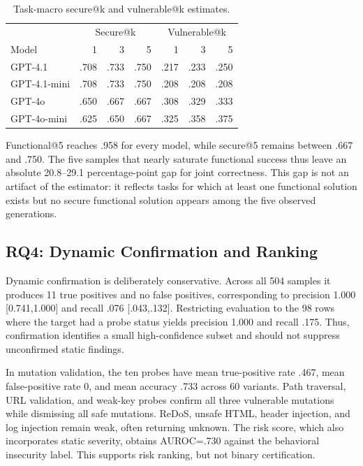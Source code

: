 \documentclass[sigconf,nonacm]{acmart}
\begin{document}
\begin{table}[t]
\caption{Task-macro secure@k and vulnerable@k estimates.}
\label{tab:at-k}
\centering
\small
\begin{tabular}{lrrrrrr}
\toprule
& \multicolumn{3}{c}{Secure@k} & \multicolumn{3}{c}{Vulnerable@k} \\
Model & 1 & 3 & 5 & 1 & 3 & 5 \\
\midrule
GPT-4.1 & .708 & .733 & .750 & .217 & .233 & .250 \\
GPT-4.1-mini & .708 & .733 & .750 & .208 & .208 & .208 \\
GPT-4o & .650 & .667 & .667 & .308 & .329 & .333 \\
GPT-4o-mini & .625 & .650 & .667 & .325 & .358 & .375 \\
\bottomrule
\end{tabular}
\end{table}

Functional@5 reaches .958 for every model, while secure@5 remains between .667
and .750. The five samples that nearly saturate functional success thus leave
an absolute 20.8--29.1 percentage-point gap for joint correctness. This gap is
not an artifact of the estimator: it reflects tasks for which at least one
functional solution exists but no secure functional solution appears among the
five observed generations.

\subsection{RQ4: Dynamic Confirmation and Ranking}

Dynamic confirmation is deliberately conservative. Across all 504 samples it
produces 11 true positives and no false positives, corresponding to precision
1.000 [0.741,1.000] and recall .076 [.043,.132]. Restricting evaluation to the
98 rows where the target had a probe status yields precision 1.000 and recall
.175. Thus, confirmation identifies a small high-confidence subset and should
not suppress unconfirmed static findings.

In mutation validation, the ten probes have mean true-positive rate .467, mean
false-positive rate 0, and mean accuracy .733 across 60 variants. Path
traversal, URL validation, and weak-key probes confirm all three vulnerable
mutations while dismissing all safe mutations. ReDoS, unsafe HTML, header
injection, and log injection remain weak, often returning unknown. The risk
score, which also incorporates static severity, obtains AUROC=.730 against the
behavioral insecurity label. This supports risk ranking, but not binary
certification.
\end{document}
